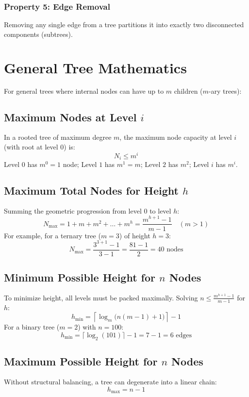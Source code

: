 \subsubsection{Property 5: Edge Removal}
Removing any single edge from a tree partitions it into exactly two disconnected components (subtrees).

\section{General Tree Mathematics}

For general trees where internal nodes can have up to $m$ children ($m$-ary trees):

\subsection{Maximum Nodes at Level $i$}
In a rooted tree of maximum degree $m$, the maximum node capacity at level $i$ (with root at level $0$) is:
\[
\boxed{N_i \leq m^i}
\]
Level $0$ has $m^0 = 1$ node; Level $1$ has $m^1 = m$; Level $2$ has $m^2$; Level $i$ has $m^i$.

\subsection{Maximum Total Nodes for Height $h$}
Summing the geometric progression from level $0$ to level $h$:
\[
N_{\max} = 1 + m + m^2 + \dots + m^h = \boxed{\frac{m^{h+1} - 1}{m - 1}} \quad (m > 1)
\]
For example, for a ternary tree ($m = 3$) of height $h = 3$:
\[
N_{\max} = \frac{3^{3+1} - 1}{3 - 1} = \frac{81 - 1}{2} = 40 \text{ nodes}
\]

\subsection{Minimum Possible Height for $n$ Nodes}
To minimize height, all levels must be packed maximally. Solving $n \leq \frac{m^{h+1}-1}{m-1}$ for $h$:
\[
\boxed{h_{\min} = \left\lceil \log_m\big(n(m - 1) + 1\big) \right\rceil - 1}
\]
For a binary tree ($m = 2$) with $n = 100$:
\[
h_{\min} = \lceil \log_2(101) \rceil - 1 = 7 - 1 = 6 \text{ edges}
\]

\subsection{Maximum Possible Height for $n$ Nodes}
Without structural balancing, a tree can degenerate into a linear chain:
\[
\boxed{h_{\max} = n - 1}
\]

